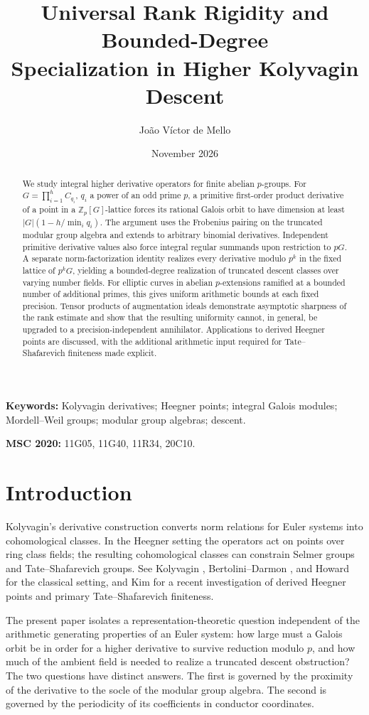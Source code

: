 \documentclass[11pt,a4paper]{article}
\title{\bfseries Universal Rank Rigidity and Bounded-Degree\protect\\ Specialization in Higher Kolyvagin Descent}
\author{Jo\~ao V\'ictor de Mello}
\date{November 2026}
\theoremstyle{definition}
\theoremstyle{remark}
\newcommand{\Zp}{\mathbb Z_p}
\begin{document}
\maketitle
\thispagestyle{plain}
\begin{abstract}
We study integral higher derivative operators for finite abelian $p$-groups. For $G=\prod_{i=1}^h C_{q_i}$, $q_i$ a power of an odd prime $p$, a primitive first-order product derivative of a point in a $\Zp[G]$-lattice forces its rational Galois orbit to have dimension at least $|G|(1-h/\min_i q_i)$. The argument uses the Frobenius pairing on the truncated modular group algebra and extends to arbitrary binomial derivatives. Independent primitive derivative values also force integral regular summands upon restriction to $pG$. A separate norm-factorization identity realizes every derivative modulo $p^k$ in the fixed lattice of $p^kG$, yielding a bounded-degree realization of truncated descent classes over varying number fields. For elliptic curves in abelian $p$-extensions ramified at a bounded number of additional primes, this gives uniform arithmetic bounds at each fixed precision. Tensor products of augmentation ideals demonstrate asymptotic sharpness of the rank estimate and show that the resulting uniformity cannot, in general, be upgraded to a precision-independent annihilator. Applications to derived Heegner points are discussed, with the additional arithmetic input required for Tate--Shafarevich finiteness made explicit.
\end{abstract}
\noindent\textbf{Keywords:} Kolyvagin derivatives; Heegner points; integral Galois modules; Mordell--Weil groups; modular group algebras; descent.\par
\noindent\textbf{MSC 2020:} 11G05, 11G40, 11R34, 20C10.

\section{Introduction}
Kolyvagin's derivative construction converts norm relations for Euler systems into cohomological classes. In the Heegner setting the operators act on points over ring class fields; the resulting cohomological classes can constrain Selmer groups and Tate--Shafarevich groups. See Kolyvagin \cite{kolyvagin}, Bertolini--Darmon \cite{bd}, and Howard \cite{howard} for the classical setting, and Kim \cite{kim} for a recent investigation of derived Heegner points and primary Tate--Shafarevich finiteness.

The present paper isolates a representation-theoretic question independent of the arithmetic generating properties of an Euler system: how large must a Galois orbit be in order for a higher derivative to survive reduction modulo $p$, and how much of the ambient field is needed to realize a truncated descent obstruction? The two questions have distinct answers. The first is governed by the proximity of the derivative to the socle of the modular group algebra. The second is governed by the periodicity of its coefficients in conductor coordinates.
\end{document}
